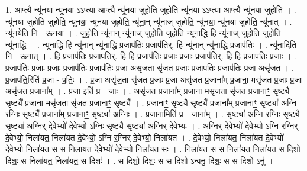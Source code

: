\documentclass[17pt]{extarticle}
\begin{document}
1. आप्त्यै॒ न्यू॑नया॒ न्यू॑न॒या ऽऽप्त्या॒ आप्त्यै॒ न्यू॑नया जुहोति जुहोति॒ न्यू॑न॒या ऽऽप्त्या॒ आप्त्यै॒ न्यू॑नया जुहोति । . न्यू॑नया जुहोति जुहोति॒ न्यू॑नया॒ न्यू॑नया जुहोति॒ न्यू॑ना॒न् न्यू॑नाज् जुहोति॒ न्यू॑नया॒ न्यू॑नया जुहोति॒ न्यू॑नात् । . न्यू॑न॒येति॒ नि - ऊ॒न॒या॒ । . जु॒हो॒ति॒ न्यू॑ना॒न् न्यू॑नाज् जुहोति जुहोति॒ न्यू॑ना॒द्धि हि न्यू॑नाज् जुहोति जुहोति॒ न्यू॑ना॒द्धि । . न्यू॑ना॒द्धि हि न्यू॑ना॒न् न्यू॑ना॒द्धि प्र॒जाप॑तिः प्र॒जाप॑ति॒र्॒. हि न्यू॑ना॒न् न्यू॑ना॒द्धि प्र॒जाप॑तिः । . न्यू॑ना॒दिति॒ नि - ऊ॒ना॒त् । . हि प्र॒जाप॑तिः प्र॒जाप॑ति॒र्॒. हि हि प्र॒जाप॑तिः प्र॒जाः प्र॒जाः प्र॒जाप॑ति॒र्॒. हि हि प्र॒जाप॑तिः प्र॒जाः । . प्र॒जाप॑तिः प्र॒जाः प्र॒जाः प्र॒जाप॑तिः प्र॒जाप॑तिः प्र॒जा असृ॑ज॒ता सृ॑जत प्र॒जाः प्र॒जाप॑तिः प्र॒जाप॑तिः प्र॒जा असृ॑जत । . प्र॒जाप॑ति॒रिति॑ प्र॒जा - प॒तिः॒ । . प्र॒जा असृ॑ज॒ता सृ॑जत प्र॒जाः प्र॒जा असृ॑जत प्र॒जाना᳚म् प्र॒जाना॒ मसृ॑जत प्र॒जाः प्र॒जा असृ॑जत प्र॒जाना᳚म् । . प्र॒जा इति॑ प्र - जाः । . असृ॑जत प्र॒जाना᳚म् प्र॒जाना॒ मसृ॑ज॒ता सृ॑जत प्र॒जानाꣳ॒॒ सृष्ट्यै॒ सृष्ट्यै᳚ प्र॒जाना॒ मसृ॑ज॒ता सृ॑जत प्र॒जानाꣳ॒॒ सृष्ट्यै᳚ । . प्र॒जानाꣳ॒॒ सृष्ट्यै॒ सृष्ट्यै᳚ प्र॒जाना᳚म् प्र॒जानाꣳ॒॒ सृष्ट्या॑ अ॒ग्नि र॒ग्निः सृष्ट्यै᳚ प्र॒जाना᳚म् प्र॒जानाꣳ॒॒ सृष्ट्या॑ अ॒ग्निः । . प्र॒जाना॒मिति॑ प्र - जाना᳚म् । . सृष्ट्या॑ अ॒ग्नि र॒ग्निः सृष्ट्यै॒ सृष्ट्या॑ अ॒ग्निर् दे॒वेभ्यो॑ दे॒वेभ्यो॒ ऽग्निः सृष्ट्यै॒ सृष्ट्या॑ अ॒ग्निर् दे॒वेभ्यः॑ । . अ॒ग्निर् दे॒वेभ्यो॑ दे॒वेभ्यो॒ ऽग्नि र॒ग्निर् दे॒वेभ्यो॒ निला॑यत॒ निला॑यत दे॒वेभ्यो॒ ऽग्नि र॒ग्निर् दे॒वेभ्यो॒ निला॑यत । . दे॒वेभ्यो॒ निला॑यत॒ निला॑यत दे॒वेभ्यो॑ दे॒वेभ्यो॒ निला॑यत॒ स स निला॑यत दे॒वेभ्यो॑ दे॒वेभ्यो॒ निला॑यत॒ सः । . निला॑यत॒ स स निला॑यत॒ निला॑यत॒ स दिशो॒ दिशः॒ स निला॑यत॒ निला॑यत॒ स दिशः॑ । . स दिशो॒ दिशः॒ स स दिशो ऽन्वनु॒ दिशः॒ स स दिशो ऽनु॑ । \newline
\end{document}

